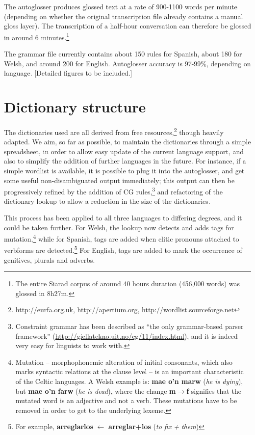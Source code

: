 \documentclass[11pt]{article}
\begin{document}
The autoglosser produces glossed text at a rate of 900-1100 words per minute (depending on whether the original transcription file already contains a manual gloss layer).  The transcription of a half-hour conversation can therefore be glossed in around 6 minutes.\footnote{The entire Siarad corpus of around 40 hours duration (456,000 words) was glossed in 8h27m.} 

The grammar file currently contains about 150 rules for Spanish, about 180 for Welsh, and around 200 for English.  Autoglosser accuracy is 97-99\%, depending on language. [Detailed figures to be included.]

\section{Dictionary structure}
\label{sec:dictionary}

The dictionaries used are all derived from free resources,\footnote{http://eurfa.org.uk, http://apertium.org, http://wordlist.sourceforge.net} though heavily adapted.  We aim, so far as possible, to maintain the dictionaries through a simple spreadsheet, in order to allow easy update of the current language support, and also to simplify the addition of further languages in the future.  For instance, if a simple wordlist is available, it is possible to plug it into the autoglosser, and get some useful non-disambiguated output immediately; this output can then be progressively refined by the addition of CG rules,\footnote{Constraint grammar has been described as ``the only grammar-based parser framework'' (\url{http://giellatekno.uit.no/cg/11/index.html}), and it is indeed very easy for linguists to work with.} and refactoring of the dictionary lookup to allow a reduction in the size of the dictionaries. 

This process has been applied to all three languages to differing degrees, and it could be taken further.  For Welsh, the lookup now detects and adds tags for mutation,\footnote{Mutation -- morphophonemic alteration of initial consonants, which also marks syntactic relations at the clause level -- is an important characteristic of the Celtic languages. A Welsh example is: \textbf{mae o'n marw} (\textit{he is dying}), but \textbf{mae o'n farw} (\textit{he is dead}), where the change \textbf{m$\rightarrow$f} signifies that the mutated word is an adjective and not a verb. These mutations have to be removed in order to get to the underlying lexeme.} while for Spanish, tags are added when clitic pronouns attached to verbforms are detected.\footnote{For example, \textbf{arreglarlos} $\leftarrow$ \textbf{arreglar+los} (\textit{to fix + them})}  For English, tags are added to mark the occurrence of genitives, plurals and adverbs.
\end{document}
